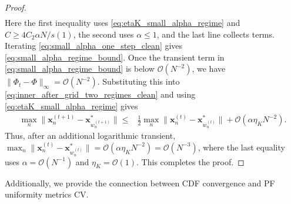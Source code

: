 \documentclass{article}
\newcommand{\Oc}{\mathcal{O}}
\newcommand{\bx}{\mathbf{x}}
\newcommand{\Farc}{\Phi}
\begin{document}
\begin{proof}
\begin{align}
\label{eq:small_alpha_one_step_clean}
\end{align}
Here the first inequality uses \eqref{eq:etaK_small_alpha_regime} and $C\ge4C_2\alpha N/s(1)$, the second uses $\alpha\le1$, and the last line collects terms. Iterating \eqref{eq:small_alpha_one_step_clean} gives \eqref{eq:small_alpha_regime_bound}. Once the transient term in \eqref{eq:small_alpha_regime_bound} is below $\Oc(N^{-2})$, we have $\|\Farc_t-\Farc\|_\infty=\Oc(N^{-2})$. Substituting this into \eqref{eq:inner_after_grid_two_regimes_clean} and using \eqref{eq:etaK_small_alpha_regime} gives
\begin{align}
\max_n\|\bx_n^{(t+1)}-\bx_{w_n^{(t+1)}}^*\| 
\leq&
\frac12\max_n\|\bx_n^{(t)}-\bx_{w_n^{(t)}}^*\|+\Oc(\alpha\eta_KN^{-2}).
\label{eq:small_alpha_inner_tracking_clean}
\end{align}
Thus, after an additional logarithmic transient, $\max_n\|\bx_n^{(t)}-\bx_{w_n^{(t)}}^*\|=\Oc(\alpha\eta_KN^{-2})=\Oc(N^{-3})$, where the last equality uses $\alpha=\Oc(N^{-1})$ and $\eta_K=\Oc(1)$. This completes the proof.
\end{proof}
Additionally, we provide the connection between CDF convergence and PF uniformity metrics CV.
\end{document}
